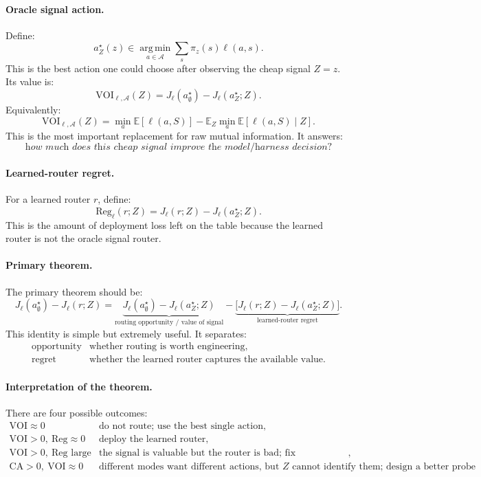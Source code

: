 \documentclass{article}
\providecommand{\argmin}{\operatorname*{arg\,min}}
\begin{document}
\paragraph{Oracle signal action.}
Define:
\[
    a^\star_Z(z)
    \in
    \argmin_{a\in\mathcal A}
    \sum_s \pi_z(s)\ell(a,s).
\]
This is the best action one could choose after observing the cheap signal \(Z=z\).
Its value is:
\[
    \mathrm{VOI}_{\ell,\mathcal A}(Z)
    =
    J_\ell(a^\star_{\emptyset})
    -
    J_\ell(a^\star_Z;Z).
\]
Equivalently:
\[
    \mathrm{VOI}_{\ell,\mathcal A}(Z)
    =
    \min_a \mathbb E[\ell(a,S)]
    -
    \mathbb E_Z
    \min_a \mathbb E[\ell(a,S)\mid Z].
\]
This is the most important replacement for raw mutual information.
It answers:
\[
    \textit{how much does this cheap signal improve the model/harness decision?}
\]

\paragraph{Learned-router regret.}
For a learned router \(r\), define:
\[
    \mathrm{Reg}_{\ell}(r;Z)
    =
    J_\ell(r;Z)-J_\ell(a^\star_Z;Z).
\]
This is the amount of deployment loss left on the table because the learned router is not
the oracle signal router.

\paragraph{Primary theorem.}
The primary theorem should be:
\[
\boxed{
    J_\ell(a^\star_{\emptyset}) - J_\ell(r;Z)
    =
    \underbrace{
    J_\ell(a^\star_{\emptyset})-J_\ell(a^\star_Z;Z)
    }_{\text{routing opportunity / value of signal}}
    -
    \underbrace{
    \bigl[
    J_\ell(r;Z)-J_\ell(a^\star_Z;Z)
    \bigr]
    }_{\text{learned-router regret}}.
}
\]
This identity is simple but extremely useful.
It separates:
\[
\begin{array}{ll}
    \text{opportunity} & \text{whether routing is worth engineering},\\
    \text{regret} & \text{whether the learned router captures the available value}.
\end{array}
\]

\paragraph{Interpretation of the theorem.}
There are four possible outcomes:
\[
\begin{array}{ll}
    \mathrm{VOI}\approx 0 &
    \text{do not route; use the best single action},\\
    \mathrm{VOI}>0,\ \mathrm{Reg}\approx 0 &
    \text{deploy the learned router},\\
    \mathrm{VOI}>0,\ \mathrm{Reg}\text{ large} &
    \text{the signal is valuable but the router is bad; fix calibration/decision rule},\\
    \mathrm{CA}>0,\ \mathrm{VOI}\approx 0 &
    \text{different modes want different actions, but \(Z\) cannot identify them;
    design a better probe}.
\end{array}
\]
\end{document}
